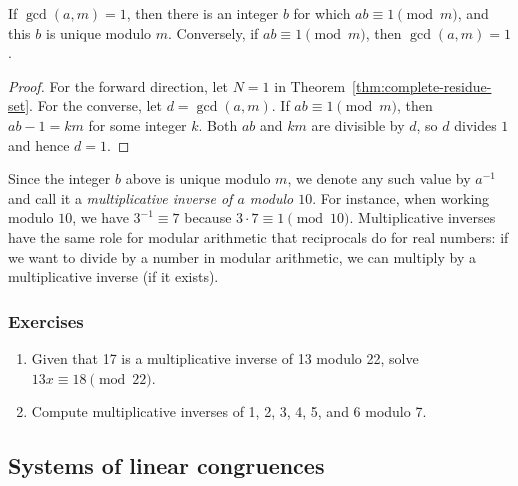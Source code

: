 \begin{corollary}
If $\gcd(a,m) = 1$, then there is an integer $b$ for which $ab\equiv 1\pmod{m}$, and this $b$ is unique modulo $m$. Conversely, if $ab\equiv 1\pmod{m}$, then $\gcd(a,m) = 1$.
\end{corollary}
\begin{proof}
For the forward direction, let $N = 1$ in Theorem~\ref{thm:complete-residue-set}. For the converse, let $d = \gcd(a,m)$. If $ab\equiv 1\pmod{m}$, then $ab - 1 = km$ for some integer $k$. Both $ab$ and $km$ are divisible by $d$, so $d$ divides $1$ and hence $d = 1$.
\end{proof}

Since the integer $b$ above is unique modulo $m$, we denote any such value by $a^{-1}$ and call it a \emph{multiplicative inverse of $a$ modulo $10$}. For instance, when working modulo $10$, we have $3^{-1}\equiv 7$ because $3\cdot 7\equiv 1\pmod{10}$. Multiplicative inverses have the same role for modular arithmetic that reciprocals do for real numbers: if we want to divide by a number in modular arithmetic, we can multiply by a multiplicative inverse (if it exists).

\subsubsection*{Exercises}

\begin{enumerate}
\item Given that 17 is a multiplicative inverse of 13 modulo 22, solve $13x\equiv 18\pmod{22}$.
\item Compute multiplicative inverses of 1, 2, 3, 4, 5, and 6 modulo 7.
\end{enumerate}


\subsection{Systems of linear congruences}

